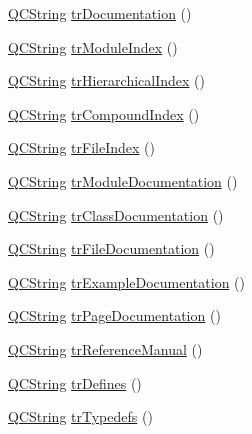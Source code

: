 \begin{DoxyCompactItemize}
\item 
\mbox{\hyperlink{class_q_c_string}{Q\+C\+String}} \mbox{\hyperlink{class_translator_polish_a759d797ca0201586919dd0d6fc9e781c}{tr\+Documentation}} ()
\item 
\mbox{\hyperlink{class_q_c_string}{Q\+C\+String}} \mbox{\hyperlink{class_translator_polish_a6b8bc70d985ec1f4bdf38a23f95707e0}{tr\+Module\+Index}} ()
\item 
\mbox{\hyperlink{class_q_c_string}{Q\+C\+String}} \mbox{\hyperlink{class_translator_polish_a22916f0880b43ad121333e7b0b3330a5}{tr\+Hierarchical\+Index}} ()
\item 
\mbox{\hyperlink{class_q_c_string}{Q\+C\+String}} \mbox{\hyperlink{class_translator_polish_a1bd65c90ef68868e97c50b22fddeb273}{tr\+Compound\+Index}} ()
\item 
\mbox{\hyperlink{class_q_c_string}{Q\+C\+String}} \mbox{\hyperlink{class_translator_polish_a2cd2082e04d120d38eef506d576e930a}{tr\+File\+Index}} ()
\item 
\mbox{\hyperlink{class_q_c_string}{Q\+C\+String}} \mbox{\hyperlink{class_translator_polish_a157f3cda12be17ee13f61cc904c4dfd2}{tr\+Module\+Documentation}} ()
\item 
\mbox{\hyperlink{class_q_c_string}{Q\+C\+String}} \mbox{\hyperlink{class_translator_polish_ad0c01539dc5aec5091c0258ea6a869b4}{tr\+Class\+Documentation}} ()
\item 
\mbox{\hyperlink{class_q_c_string}{Q\+C\+String}} \mbox{\hyperlink{class_translator_polish_a7e86660e9e6797d66cd8f7513dda1f2d}{tr\+File\+Documentation}} ()
\item 
\mbox{\hyperlink{class_q_c_string}{Q\+C\+String}} \mbox{\hyperlink{class_translator_polish_adda882b0d8277983bbc5560fbc26aa78}{tr\+Example\+Documentation}} ()
\item 
\mbox{\hyperlink{class_q_c_string}{Q\+C\+String}} \mbox{\hyperlink{class_translator_polish_ac200e0c70374d86feca6ff709635dda3}{tr\+Page\+Documentation}} ()
\item 
\mbox{\hyperlink{class_q_c_string}{Q\+C\+String}} \mbox{\hyperlink{class_translator_polish_afc39e687267da214628ca4c2616e96a1}{tr\+Reference\+Manual}} ()
\item 
\mbox{\hyperlink{class_q_c_string}{Q\+C\+String}} \mbox{\hyperlink{class_translator_polish_aa4a9ddef7581b29a7640e519b86b4774}{tr\+Defines}} ()
\item 
\mbox{\hyperlink{class_q_c_string}{Q\+C\+String}} \mbox{\hyperlink{class_translator_polish_a64493b275b4674d073ab5b617c83d9df}{tr\+Typedefs}} ()
\item 

\end{DoxyCompactItemize}
